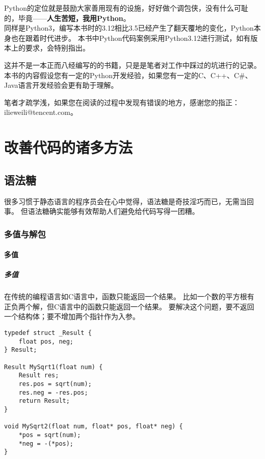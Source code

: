 \documentclass{ctexbook}
\begin{document}
Python的定位就是鼓励大家善用现有的设施，好好做个调包侠，没有什么可耻的，毕竟——\textbf{人生苦短，我用Python}。\\[0.1in]

同样是Python3，编写本书时的3.12相比3.5已经产生了翻天覆地的变化，Python本身也在跟着时代进步。
本书中Python代码案例采用Python3.12进行测试，如有版本上的要求，会特别指出。

这并不是一本正而八经编写的的书籍，只是是笔者对工作中踩过的坑进行的记录。
本书的内容假设您有一定的Python开发经验，如果您有一定的C、C++、C\#、Java语言开发经验会更有助于理解。

笔者才疏学浅，如果您在阅读的过程中发现有错误的地方，感谢您的指正：ilieweili@tencent.com。

\tableofcontents

\part{改善代码的诸多方法}

\chapter{语法糖}
很多习惯于静态语言的程序员会在心中觉得，语法糖是奇技淫巧而已，无需当回事。
但语法糖确实能够有效帮助人们避免给代码写得一团糟。

\section{多值与解包}

\subsection{多值}

\subsubsection{多值}

在传统的编程语言如C语言中，函数只能返回一个结果。
比如一个数的平方根有正负两个解，但C语言中的函数只能返回一个结果。
要解决这个问题，要不返回一个结构体；要不增加两个指针作为入参。

\begin{verbatim}
typedef struct _Result {
    float pos, neg;
} Result;

Result MySqrt1(float num) {
    Result res;
    res.pos = sqrt(num);
    res.neg = -res.pos;
    return Result;
}

void MySqrt2(float num, float* pos, float* neg) {
    *pos = sqrt(num);
    *neg = -(*pos);
}
\end{verbatim}
\end{document}
